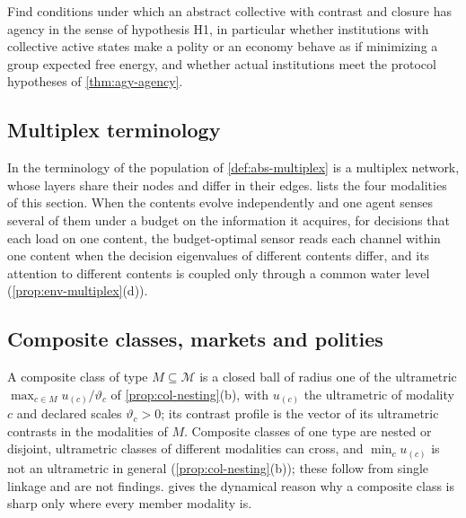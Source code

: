 \begin{openproblem}\label{open:abs-institutions}
Find conditions under which an abstract collective with contrast and closure has agency in the sense of hypothesis H1, in particular whether institutions with collective active states make a polity or an economy behave as if minimizing a group expected free energy, and whether actual institutions meet the protocol hypotheses of \cref{thm:agy-agency}.
\end{openproblem}

\subsection{Multiplex terminology}\label{sup:abs-multiplex-terminology}

In the terminology of \citet{kivela2014multilayer} the population of \cref{def:abs-multiplex} is a multiplex network, whose layers share their nodes and differ in their edges.  lists the four modalities of this section. When the contents evolve independently and one agent senses several of them under a budget on the information it acquires, for decisions that each load on one content, the budget-optimal sensor reads each channel within one content when the decision eigenvalues of different contents differ, and its attention to different contents is coupled only through a common water level (\cref{prop:env-multiplex}(d)).

\subsection{Composite classes, markets and polities}\label{sup:abs-composite-classes-markets-and-polities}

A composite class of type $M\subseteq\mathcal M$ is a closed ball of radius one of the ultrametric $\max_{c\in M}u_{(c)}/\vartheta_c$ of \cref{prop:col-nesting}(b), with $u_{(c)}$ the ultrametric of modality $c$ and declared scales $\vartheta_c>0$; its contrast profile is the vector of its ultrametric contrasts in the modalities of $M$. Composite classes of one type are nested or disjoint, ultrametric classes of different modalities can cross, and $\min_cu_{(c)}$ is not an ultrametric in general (\cref{prop:col-nesting}(b)); these follow from single linkage and are not findings.  gives the dynamical reason why a composite class is sharp only where every member modality is.

